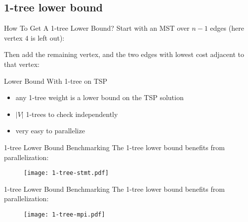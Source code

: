 \subsection{1-tree lower bound}

\begin{frame}[t]{How To Get A 1-tree Lower Bound?}
  Start with an MST over $n-1$ edges (here vertex $4$ is left out):


  Then add the remaining vertex, and the two edges with lowest cost adjacent to that vertex:

\end{frame}

\begin{frame}[t]{Lower Bound With 1-tree on TSP}
  \vfill

  \begin{itemize}
    \item any 1-tree weight is a lower bound on the TSP solution \cite{held_traveling-salesman_1970}
    \item $|V|$ 1-trees to check independently
    \item very easy to parallelize
  \end{itemize}

  \vfill
\end{frame}

\begin{frame}[t]{1-tree Lower Bound Benchmarking}
  \vfill
  The 1-tree lower bound benefits from parallelization:
  
  \begin{figure}
    \texttt{[image: 1-tree-stmt.pdf]}
  \end{figure}
  \vfill
\end{frame}

\begin{frame}[t]{1-tree Lower Bound Benchmarking}
  \vfill
  The 1-tree lower bound benefits from parallelization:
  
  \begin{figure}
    \texttt{[image: 1-tree-mpi.pdf]}
  \end{figure}
  \vfill
\end{frame}
